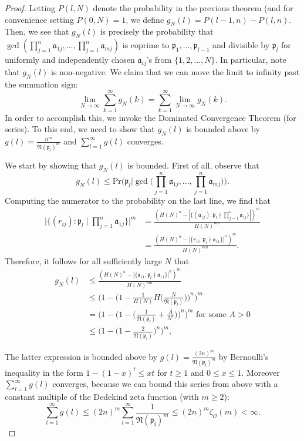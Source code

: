 \documentclass[12pt]{amsart}
\theoremstyle{definition}
\newcommand{\f}[1]{\mathfrak{#1}}
\begin{document}
\begin{proof}
	Letting $P(l, N)$ denote the probability in the previous theorem (and for convenience setting $P(0, N) = 1$, we define $g_N(l) = P(l-1, n) - P(l, n)$. Then, we see that $g_N(l)$ is precisely the probability that $\gcd(\prod_{j=1}^n \mathfrak{a}_{1j}, ... , \prod_{j=1}^n \mathfrak{a}_{mj})$ is coprime to $\mathfrak{p}_1, ..., \mathfrak{p}_{l-1}$ and divisible by $\mathfrak{p}_l$ for uniformly and independently chosen $\mathfrak{a}_{ij}$'s from $\{1, 2, ..., N\}$. In particular, note that $g_N(l)$ is non-negative. We claim that we can move the limit to infinity past the summation sign:
	$$\lim_{N \to \infty} \sum_{k=1}^{\infty} g_N(k) = \sum_{k=1}^{\infty} \lim_{N \to \infty} g_N(k).$$
	In order to accomplish this, we invoke the Dominated Convergence Theorem (for series). To this end, we need to show that $g_N(l)$ is bounded above by $g(l) = \frac{n^m}{\mathfrak{N}(\mathfrak{p}_l)^m}$ and $\sum_{l=1}^{\infty} g(l)$ converges.
	
	We start by showing that $g_N(l)$ is bounded. First of all, observe that
	$$g_N(l) \leq \text{Pr}\Big(\mathfrak{p}_l \Big| \gcd\Big(\prod_{j=1}^n \mathfrak{a}_{1j}, ... , \prod_{j=1}^n \mathfrak{a}_{mj}\Big)\Big).$$
	Computing the numerator to the probability on the last line, we find that
	\begin{align*} 
		\Big|\{(r_{ij}) : \mathfrak{p}_l \mid \prod_{j=1}^n \mathfrak{a}_{1j}\}\Big|^m &= \frac{(H(N)^n - |\{(\mathfrak{a}_{1j}) : \mathfrak{p}_l \nmid \prod_{j=1}^n \mathfrak{a}_{1j}\}|)^m}{H(N)^{mn}}\\ &= \frac{(H(N)^n - |\{r_{11} : \mathfrak{p}_l \nmid \mathfrak{a}_{11}\}|^n)^m}{H(N)^{mn}}. \end{align*}
	Therefore, it follows for all sufficiently large $N$ that
	\begin{align*} 
		g_N(l) &\leq \frac{(H(N)^n - |\{\f{a}_{11} : \mathfrak{p}_l \nmid \mathfrak{a}_{11}\}|^n)^m}{H(N)^{mn}}\\ &\leq \Big(1 - \Big(1 - \frac{1}{H(N)} H\Big(\frac{N}{\f{N}(\f{p}_l)}\Big)\Big)^n\Big)^m\\
		&= \Big(1- \Big(1 - \Big(\frac{1}{\mathfrak{N}(\mathfrak{p}_l)} + \frac{A}{N^{\epsilon}}\Big)\Big)^n \Big)^m \text{ for some } A > 0\\ &\leq \Big(1- \Big(1 - \frac{2}{\mathfrak{N}(\mathfrak{p}_l)}\Big)^n \Big)^m, \end{align*}
	
	The latter expression is bounded above by $g(l) = \frac{(2n)^m}{\f{N(\f{p}_l)}^m}$ by Bernoulli's inequality in the form $1-(1-x)^t\leq xt$ for $t\geq 1$ and $0\leq x \leq 1$. Moreover $\sum_{l=1}^{\infty} g(l)$ converges, because we can bound this series from above with a constant multiple of the Dedekind zeta function (with $m \geq 2$):
	$$\sum_{l=1}^{\infty}g(l)\leq (2n)^m\sum_{l=1}^{\infty}\frac{1}{\f{N(\f{p}_l)}^m}\leq (2n)^m \zeta_{\mathcal{O}}(m) < \infty.$$
	

\end{proof}
\end{document}
